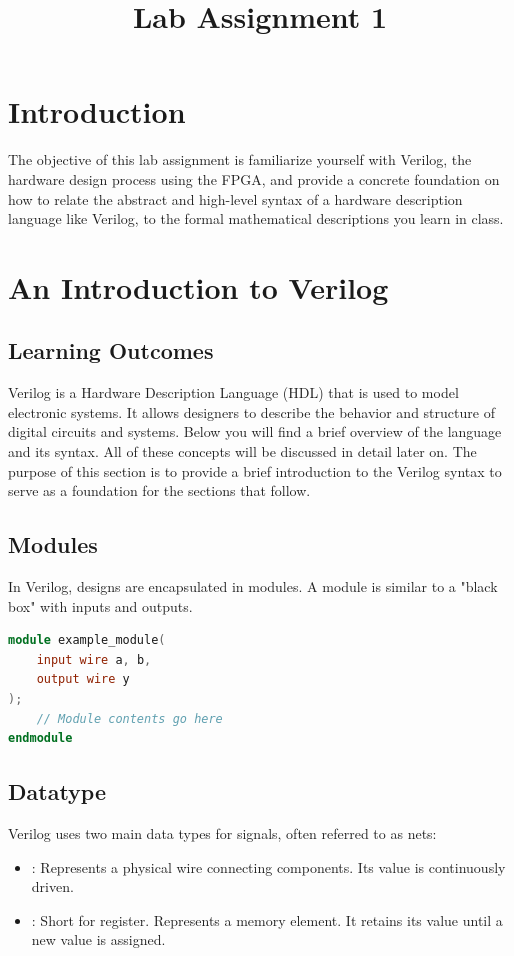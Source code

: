 \documentclass[12pt]{labmanual}
\title{Lab Assignment 1 }
\author{}
\date{}
\begin{document}
\captionsetup{tablewithin=section}
\maketitle
\section{Introduction}
The objective of this lab assignment is familiarize yourself with Verilog, the hardware design process using the FPGA, and provide a concrete foundation on how to relate the abstract and high-level syntax of a hardware description language like Verilog, to the formal mathematical descriptions you learn in class.

\section{An Introduction to Verilog}

\subsection{Learning Outcomes}
Verilog is a Hardware Description Language (HDL) that is used to model electronic systems. It allows designers to describe the behavior and structure of digital circuits and systems. Below you will find a brief overview of the language and its syntax. All of these concepts will be discussed in detail later on. The purpose of this section is to provide a brief introduction to the Verilog syntax to serve as a foundation for the sections that follow.

\subsection{Modules}

In Verilog, designs are encapsulated in modules. A module is similar to a "black box" with inputs and outputs.

\begin{lstlisting}[language=verilog]    
module example_module(
    input wire a, b,
    output wire y
);
    // Module contents go here
endmodule
\end{lstlisting}


\subsection{Datatype}

Verilog uses two main data types for signals, often referred to as nets:
\begin{itemize}
    \item {: Represents a physical wire connecting components. Its value is continuously driven.}
    \item {: Short for register. Represents a memory element. It retains its value until a new value is assigned.}
\end{itemize}
\end{document}
